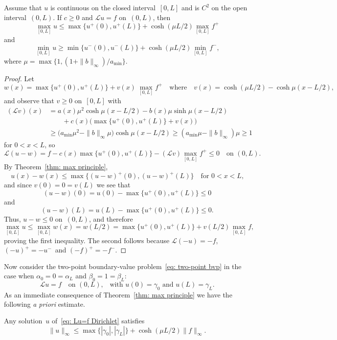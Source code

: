 \begin{theorem}\label{thm: max principle}
Assume that $u$ is continuous on the closed interval~$[0,L]$ and is $C^2$ on 
the open interval~$(0,L)$. If $c\ge0$ and $\mathcal{L}u=f$ on~$(0,L)$, then
\[
\max_{[0,L]}u\le\max\{u^+(0),u^+(L)\}+\cosh(\mu L/2)\max_{[0,L]}f^+
\]
and
\[
\min_{[0,L]}u\ge\min\{u^-(0),u^-(L)\}+\cosh(\mu L/2)\min_{[0,L]}f^-,
\]
where $\mu=\max\bigl\{1,(1+\|b\|_\infty)/a_{\min}\bigr\}$.
\end{theorem}
\begin{proof}
Let
\[
w(x)=\max\{u^+(0),u^+(L)\}+v(x)\,\max_{[0,L]}f^+
\quad\text{where}\quad
v(x)=\cosh(\mu L/2)-\cosh\mu(x-L/2),
\]
and observe that $v\ge0$ on~$[0,L]$ with
\begin{align*}
(\mathcal{L}v)(x)&=a(x)\mu^2\cosh\mu(x-L/2)
	-b(x)\mu\sinh\mu(x-L/2)\\
	&\qquad{}+c(x)\bigl(\max\{u^+(0),u^+(L)\}+v(x)\big)\\
	&\ge\bigl(a_{\min}\mu^2-\|b\|_\infty\mu\bigr)\cosh\mu(x-L/2)
	\ge(a_{\min}\mu-\|b\|_\infty)\mu\ge1
\end{align*}
for $0<x<L$, so
\[
\mathcal{L}(u-w)=f-c(x)\max\{u^+(0),u^+(L)\}-(\mathcal{L}v)\max_{[0,L]}f^+
	\le0\quad\text{on $(0,L)$.}
\]
By Theorem~\ref{thm: max principle},
\[
u(x)-w(x)\le\max\{(u-w)^+(0),(u-w)^+(L)\}\quad\text{for $0<x<L$,}
\]
and since $v(0)=0=v(L)$ we see that 
\[
(u-w)(0)=u(0)-\max\{u^+(0),u^+(L)\}\le0
\]
and
\[
(u-w)(L)=u(L)-\max\{u^+(0),u^+(L)\}\le0.
\]
Thus, $u-w\le0$ on~$(0,L)$, and therefore 
\[
\max_{[0,L]}u\le\max_{[0,L]}w(x)=w(L/2)=\max\{u^+(0),u^+(L)\}
	+v(L/2)\max_{[0,L]}f, 
\]
proving the first inequality.  
The second follows because $\mathcal{L}(-u)=-f$, $(-u)^+=-u^-$~and
$(-f)^+=-f^-$.
\end{proof}

Now consider the two-point boundary-value problem~\eqref{eq: two-point bvp} in 
the case when $\alpha_0=0=\alpha_L$ and $\beta_0=1=\beta_L$:
\begin{equation}\label{eq: Lu=f Dirichlet}
\mathcal{L}u=f\quad\text{on $(0,L)$,}
	\quad\text{with $u(0)=\gamma_0$ and $u(L)=\gamma_L$.}
\end{equation}
As an immediate consequence of Theorem~\ref{thm: max principle} we have the 
following \emph{a priori} estimate.

\begin{theorem}\label{thm: Lu=f apriori infty}
Any solution~$u$ of~\eqref{eq: Lu=f Dirichlet} satisfies
\[
\|u\|_\infty\le\max\{|\gamma_0|,|\gamma_L|\}+\cosh(\mu L/2)\|f\|_\infty.
\]
\end{theorem}

